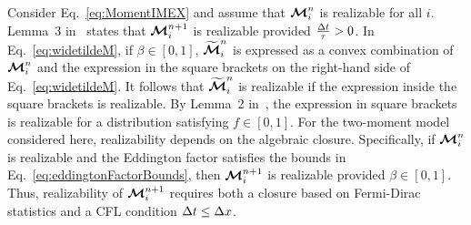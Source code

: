 Consider Eq.~\eqref{eq:MomentIMEX} and assume that $\boldsymbol{\mathcal{M}}_{i}^{n}$ is realizable for all $i$.  
Lemma~3 in~\cite{chu_etal_2018} states that $\boldsymbol{\mathcal{M}}^{n+1}_{i}$ is realizable provided $\frac{\Delta t}{\tau} > 0$. 
In Eq.~\eqref{eq:widetildeM}, if $\beta \in [0,1]$, $\widetilde{\boldsymbol{\mathcal{M}}}^{n}_{i}$ is expressed as a convex combination of $\boldsymbol{\mathcal{M}}_{i}^{n}$ and the expression in the square brackets on the right-hand side of Eq.~\eqref{eq:widetildeM}.  
It follows that $\widetilde{\boldsymbol{\mathcal{M}}}^{n}_{i}$ is realizable if the expression inside the square brackets is realizable.  
By Lemma~2 in~\cite{chu_etal_2018}, the expression in square brackets is realizable for a distribution satisfying $f\in[0,1]$.  
For the two-moment model considered here, realizability depends on the algebraic closure.  
Specifically, if $\boldsymbol{\mathcal{M}}_{i}^{n}$ is realizable and the Eddington factor satisfies the bounds in Eq.~\eqref{eq:eddingtonFactorBounds}, then $\boldsymbol{\mathcal{M}}^{n+1}_{i}$ is realizable provided $\beta \in [0,1]$.  
Thus, realizability of $\boldsymbol{\mathcal{M}}^{n+1}_{i}$ requires both a closure based on Fermi-Dirac statistics and a CFL condition $\Delta t\le\Delta x$.  